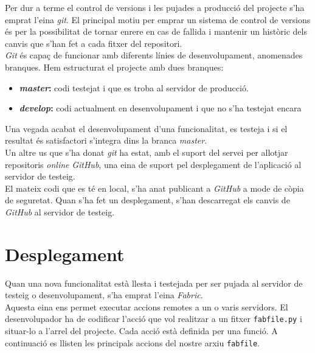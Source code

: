 Per dur a terme el control de versions i les pujades a producció del projecte s'ha emprat l'eina \emph{git}. El principal motiu per emprar un sistema de control de versions és per la possibilitat de tornar enrere en cas de fallida i mantenir un històric dels canvis que s'han fet a cada fitxer del repositori.\\

\emph{Git} és capaç de funcionar amb diferents línies de desenvolupament, anomenades branques. Hem estructurat el projecte amb dues branques:

\begin{itemize}
	\item \textbf{\emph{master}:} codi testejat i que es troba al servidor de producció.
	\item \textbf{\emph{develop}:} codi actualment en desenvolupament i que no s'ha testejat encara
\end{itemize}

Una vegada acabat el desenvolupament d'una funcionalitat, es testeja i si el resultat és satisfactori s'integra dins la branca \emph{master}.\\

Un altre us que s'ha donat \emph{git} ha estat, amb el suport del servei per allotjar repositoris \emph{online} \emph{GitHub}, una eina de suport pel desplegament de l'aplicació al servidor de testeig.\\

El mateix codi que es té en local, s'ha anat publicant a \emph{GitHub} a mode de còpia de seguretat. Quan s'ha fet un desplegament, s'han descarregat els canvis de \emph{GitHub} al servidor de testeig.

\section{Desplegament}

Quan una nova funcionalitat està llesta i testejada per ser pujada al servidor de testeig o desenvolupament, s'ha emprat l'eina \emph{Fabric}. \\

Aquesta eina ens permet executar accions remotes a un o varis servidors. El desenvolupador ha de codificar l'acció que vol realitzar a un fitxer \texttt{fabfile.py} i situar-lo a l'arrel del projecte. Cada acció està definida per una funció. A continuació es llisten les principals accions del nostre arxiu \texttt{fabfile}.

